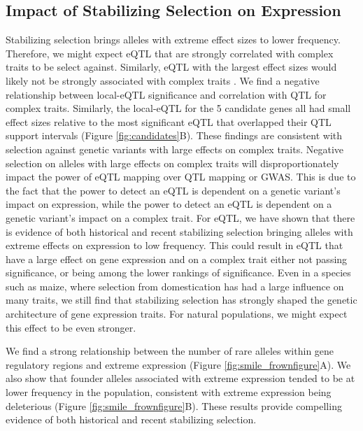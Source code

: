 \documentclass[article,9pt,twocolumn,twoside]{rilabRxiv}
\begin{document}
\subsection{Impact of Stabilizing Selection on Expression}
Stabilizing selection brings alleles with extreme effect sizes to lower frequency.
Therefore, we might expect eQTL that are strongly correlated with complex traits to be select against.
Similarly, eQTL with the largest effect sizes would likely not be strongly associated with complex traits \citep{Mostafavi}.
We find a negative relationship between local-eQTL significance and correlation with QTL for complex traits.
Similarly, the local-eQTL for the 5 candidate genes all had small effect sizes relative to the most significant eQTL that overlapped their QTL support intervals (Figure \ref{fig:candidates}B).
These findings are consistent with selection against genetic variants with large effects on complex traits.
Negative selection on alleles with large effects on complex traits will disproportionately impact the power of eQTL mapping over QTL mapping or GWAS.
This is due to the fact that the power to detect an eQTL is dependent on a genetic variant's impact on expression, while the power to detect an eQTL is dependent on a genetic variant's impact on a complex trait.
For eQTL, we have shown that there is evidence of both historical and recent stabilizing selection bringing alleles with extreme effects on expression to low frequency.
This could result in eQTL that have a large effect on gene expression and on a complex trait either not passing significance, or being among the lower rankings of significance.
Even in a species such as maize, where selection from domestication has had a large influence on many traits, we still find that stabilizing selection has strongly shaped the genetic architecture of gene expression traits.
For natural populations, we might expect this effect to be even stronger.
\par
We find a strong relationship between the number of rare alleles within gene regulatory regions and extreme expression (Figure \ref{fig:smile_frownfigure}A). 
We also show that founder alleles associated with extreme expression tended to be at lower frequency in the population, consistent with extreme expression being deleterious (Figure \ref{fig:smile_frownfigure}B).
These results provide compelling evidence of both historical and recent stabilizing selection.
\end{document}
